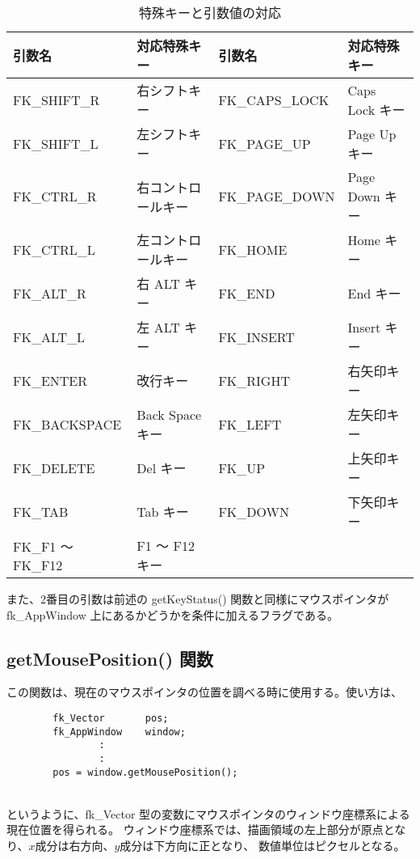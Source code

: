 \begin{table}[H]
\caption{特殊キーと引数値の対応}
\label{tbl:fkSpecialKey}
\begin{center}
\begin{tabular}{|p{3cm}|p{3cm}||p{3cm}|p{3cm}|}
\hline
引数名 & 対応特殊キー & 引数名 & 対応特殊キー \\ \hline \hline
FK\_SHIFT\_R	& 右シフトキー &
	FK\_CAPS\_LOCK	& Caps Lock キー \\ \hline
FK\_SHIFT\_L	& 左シフトキー &
	FK\_PAGE\_UP	& Page Up キー \\ \hline
FK\_CTRL\_R	& 右コントロールキー &
	FK\_PAGE\_DOWN	& Page Down キー \\ \hline
FK\_CTRL\_L	& 左コントロールキー &
	FK\_HOME	& Home キー \\ \hline
FK\_ALT\_R	& 右 ALT キー &
	FK\_END		& End キー \\ \hline
FK\_ALT\_L	& 左 ALT キー &
	FK\_INSERT	& Insert キー \\ \hline
FK\_ENTER	& 改行キー &
	FK\_RIGHT	& 右矢印キー \\ \hline
FK\_BACKSPACE	& Back Space キー &
	FK\_LEFT	& 左矢印キー \\ \hline
FK\_DELETE	& Del キー &
	FK\_UP		& 上矢印キー \\ \hline
FK\_TAB		& Tab キー &
	FK\_DOWN	& 下矢印キー \\ \hline
FK\_F1 〜 FK\_F12 & F1 〜 F12 キー &
		& \\ \hline
\end{tabular}
\end{center}
\end{table}

また、2番目の引数は前述の getKeyStatus() 関数と同様にマウスポインタが
fk\_AppWindow 上にあるかどうかを条件に加えるフラグである。

\subsection{getMousePosition() 関数}
この関数は、現在のマウスポインタの位置を調べる時に使用する。使い方は、
\\
\begin{breakbox}
\begin{verbatim}
        fk_Vector       pos;
        fk_AppWindow    window;
                :
                :
        pos = window.getMousePosition();
\end{verbatim}
\end{breakbox}
~ \\
というように、fk\_Vector 型の変数にマウスポインタのウィンドウ座標系による現在位置を得られる。
ウィンドウ座標系では、描画領域の左上部分が原点となり、\(x\)成分は右方向、\(y\)成分は下方向に正となり、
数値単位はピクセルとなる。

